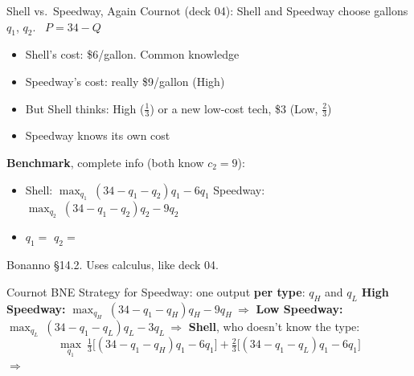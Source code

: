
\begin{frame}{Shell vs.\ Speedway, Again}
Cournot (deck 04): Shell and Speedway choose gallons $q_1$, $q_2$. \ $P=34-Q$
\begin{itemize}
    \item Shell's cost: \$6/gallon. Common knowledge
    \item Speedway's cost: really \$9/gallon (High)
    \item But Shell thinks: High ($\tfrac13$) or a new low-cost tech, \$3 (Low, $\tfrac23$)
    \item Speedway knows its own cost
\end{itemize}
\bsk
\textbf{Benchmark}, complete info (both know $c_2=9$):
\begin{itemize}
    \item Shell: $\max_{q_1}\ (34-q_1-q_2)q_1-6q_1$ \quad Speedway: $\max_{q_2}\ (34-q_1-q_2)q_2-9q_2$
    \item $q_1=$ \underline{\hspace{0.5in}} \qquad $q_2=$ \underline{\hspace{0.5in}}
\end{itemize}
\vfill
{\footnotesize Bonanno \S14.2. Uses calculus, like deck 04.}
\vspace{-0.2in}
\end{frame}

\begin{frame}{Cournot BNE}
Strategy for Speedway: one output \textbf{per type}: $q_H$ and $q_L$
\bsk
\textbf{High Speedway:} $\max_{q_H}\ (34-q_1-q_H)q_H-9q_H \ \Rightarrow$ \underline{\hspace{1.5in}}
\bsk
\textbf{Low Speedway:} $\max_{q_L}\ (34-q_1-q_L)q_L-3q_L \ \Rightarrow$ \underline{\hspace{1.5in}}
\bsk
\textbf{Shell}, who doesn't know the type:
$$\max_{q_1}\ \tfrac13\big[(34-q_1-q_H)q_1-6q_1\big]+\tfrac23\big[(34-q_1-q_L)q_1-6q_1\big]$$
$\Rightarrow$ \underline{\hspace{1.5in}}
\bsk
{}
\vspace{-0.3in}
\end{frame}

